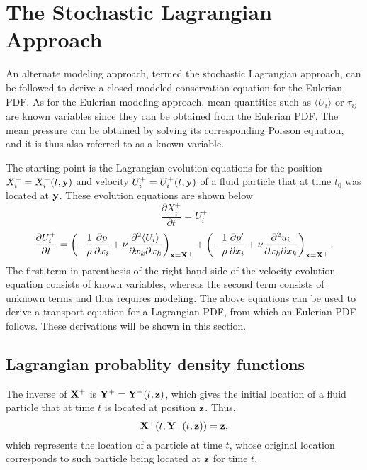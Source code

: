 \documentclass[oneside,a4paper,11pt]{report}
\newcommand{\pavg}{\overline{p}}
\newcommand{\pfluc}{p'}
\newcommand{\rs}{\tau}          %
\newcommand{\uiavg}{\langle U_i \rangle}
\newcommand{\uifluc}{u_i}
\begin{document}
\section{The Stochastic Lagrangian Approach}

An alternate modeling approach, termed the stochastic Lagrangian approach, can be followed to derive a closed modeled conservation equation for the Eulerian PDF. As for the Eulerian modeling approach, mean quantities such as $\uiavg$ or $\rs_{ij}$ are known variables since they can be obtained from the Eulerian PDF. The mean pressure can be obtained by solving its corresponding Poisson equation, and it is thus also referred to as a known variable. 

The starting point is the Lagrangian evolution equations for the position $X_i^+ = X_i^+(t,\mathbf{y})$ and velocity $U_i^+ = U_i^+(t,\mathbf{y})$ of a fluid particle that at time $t_0$ was located at $\mathbf{y}$. These evolution equations are shown below 
\begin{equation}
\frac{\partial X_i^+}{\partial t} = U_i^+ 
\end{equation}
\begin{equation}
\frac{\partial U_i^+}{\partial t} = \left (-\frac{1}{\rho} \frac{\partial \pavg}{\partial x_i} + \nu \frac{\partial^2 \uiavg}{\partial x_k \partial x_k} \right)_{\xvec = \Xvec^+} + \left ( - \frac{1}{\rho} \frac{\partial \pfluc}{\partial x_i} +  \nu \frac{\partial^2 \uifluc}{\partial x_k \partial x_k} \right)_{\xvec = \Xvec^+}.
\end{equation}
The first term in parenthesis of the right-hand side of the velocity evolution equation consists of known variables, whereas the second term consists of unknown terms and thus requires modeling. The above equations can be used to derive a transport equation for a Lagrangian PDF, from which an Eulerian PDF follows. These derivations will be shown in this section. 

\subsection{Lagrangian probablity density functions}

The inverse of $\mathbf{X}^+$ is $\mathbf{Y}^+ = \mathbf{Y}^+(t,\mathbf{z})$, which gives the initial location of a fluid particle that at time $t$ is located at position $\mathbf{z}$. Thus,
\begin{equation}
\mathbf{X}^+(t,\mathbf{Y}^+(t,\mathbf{z})) = \mathbf{z},
\end{equation}
which represents the location of a particle at time $t$, whose original location corresponds to such particle being located at $\mathbf{z}$ for time $t$.
\end{document}
